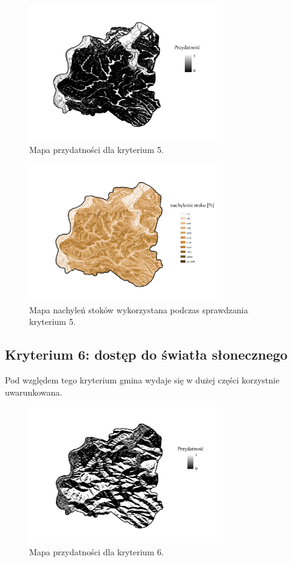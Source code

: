 \documentclass{article}
\begin{document}
\begin{figure}[H]
    \centering
    \includegraphics[width=0.75\textwidth]{img/plesna-kryterium5-layout.jpg}
    \caption{Mapa przydatności dla kryterium 5.}
\end{figure}

\begin{figure}[H]
    \centering
    \includegraphics[width=0.75\textwidth]{img/plesna-kryterium5-stoki.jpg}
    \caption{Mapa nachyleń stoków wykorzystana podczas sprawdzania kryterium 5.}
\end{figure}


\subsection{Kryterium 6: dostęp do światła słonecznego}
Pod względem tego kryterium gmina wydaje się w dużej części korzystnie uwarunkowana.

\begin{figure}[H]
    \centering
    \includegraphics[width=0.75\textwidth]{img/plesna-kryterium6-layout.jpg}
    \caption{Mapa przydatności dla kryterium 6.}
\end{figure}
\end{document}
